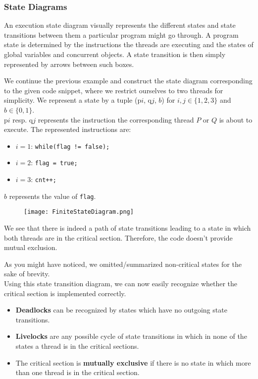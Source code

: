 \documentclass[main]{subfiles}
\begin{document}
\subsubsection{State Diagrams}
An execution state diagram visually represents the different states and state transitions between them a particular program might go through. A program state is determined by the instructions the threads are executing and the states of global variables and concurrent objects. A state transition is then simply represented by arrows between such boxes.
\begin{example}
    We continue the previous example and construct the state diagram corresponding to the given code snippet, where we restrict ourselves to two threads for simplicity. We represent a state by a tuple (p$i$, q$j$, $b$) for $i,j \in \{1,2,3\}$ and $b \in \{0,1\}$.\\
    p$i$ resp. q$j$ represents the instruction the corresponding thread $P$ or $Q$ is about to execute. The represented instructions are:
    \begin{itemize}
        \item $i = 1$: \texttt{while(flag != false);}
        \item $i = 2$: \texttt{flag = true;}
        \item $i = 3$: \texttt{cnt++;}
    \end{itemize}
    $b$ represents the value of \texttt{flag}.
    \begin{figure}[H]
        \centering
        \texttt{[image: FiniteStateDiagram.png]}
    \end{figure}
    \noindent We see that there is indeed a path of state transitions leading to a state in which both threads are in the critical section. Therefore, the code doesn't provide mutual exclusion.
\end{example}
As you might have noticed, we omitted/summarized non-critical states for the sake of brevity.\\[3mm]
Using this state transition diagram, we can now easily recognize whether the critical section is implemented correctly.
\begin{itemize}
    \item \textbf{Deadlocks} can be recognized by states which have no outgoing state transitions.
    \item \textbf{Livelocks} are any possible cycle of state transitions in which in none of the states a thread is in the critical sections.
    \item The critical section is \textbf{mutually exclusive} if there is no state in which more than one thread is in the critical section.
\end{itemize}
\newpage
\end{document}
